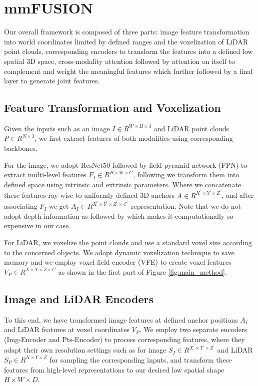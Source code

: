 \documentclass[10pt,twocolumn,letterpaper]{article}
\begin{document}
\section{mmFUSION}
Our overall framework is composed of three parts: image feature transformation into world coordinates limited by defined ranges and the voxelization of LiDAR point clouds, corresponding encoders to transform the features into a defined low spatial 3D space, cross-modality attention followed by attention on itself to complement and weight the meaningful features which further followed by a final layer to generate joint features.

\subsection{Feature Transformation and Voxelization}
Given the inputs such as an image $I \in R^{W\times H \times 3} $ and LiDAR point clouds $P \in R^{N\times 3}$, we first extract features of both modalities using corresponding backbones. 

For the image, we adopt ResNet50 \cite{he2016deep} followed by field pyramid network (FPN) \cite{lin2017feature} to extract multi-level features $F_I  \in R^{H \times W \times C}$, following \cite{rukhovich2022imvoxelnet, philion2020lift} we transform them into defined space using intrinsic and extrinsic parameters. Where we concatenate these features ray-wise to uniformly defined 3D anchors $A \in R^{X^\prime \times Y^\prime \times Z^\prime}$, and after associating $F_I$ we get $A_I \in R^{X^\prime \times Y^\prime \times Z^\prime \times C^\prime}$ representation. Note that we do not adopt depth information as followed by \cite{li2022unifying} which makes it computationally so expensive in our case. 

For LiDAR, we voxelize the point clouds and use a standard voxel size according to the concerned objects. We adopt dynamic voxelization \cite{zhou2019endtoend} technique to save memory and we employ voxel field encoder (VFE) \cite{zhou2018voxelnet} to create voxel features $V_P \in R^{X \times Y \times Z \times C}$ as shown in the first part of Figure \ref{fig:main_method}.


\subsection{Image and LiDAR Encoders}
To this end, we have transformed image features at defined anchor positions $A_I$ and LiDAR features at voxel coordinates  $V_P$. We employ two separate encoders (Img-Encoder and Pts-Encoder) to process corresponding features, where they adapt their own resolution settings such as for image $S_I \in R^{X^\prime\times Y^\prime\times Z^\prime}$ and LiDAR $S_P \in R^{X\times Y\times Z}$ for sampling the corresponding inputs, and transform these features from high-level representations to our desired low spatial shape ${H\times W\times D}$. 
\end{document}
